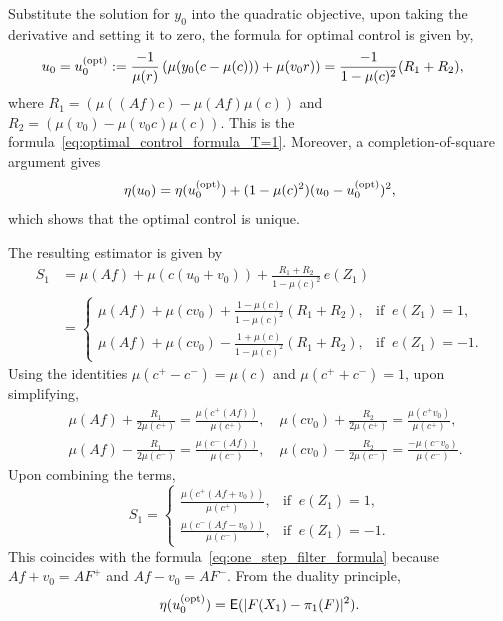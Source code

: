 \documentclass[twoside,11pt]{article}
\def\E{{\sf E}}
\newcommand{\newP}[1]{\medskip\noindent{\bf #1:}}
\def\E{{\sf E}}
\def\E{{\sf E}}
\def\opt{{\text{\rm (opt)}}}
\begin{document}
\newP{$\bullet$ Case where $\mu(r)\neq 0$} Substitute the solution
for $y_0$ into the quadratic objective, upon taking the
derivative and setting it to zero, the formula for optimal control is
given by,
\begin{align*}
  u_0 = u_0^\opt & :=
        \frac{-1}{\mu(r)} \left( \mu(y_0(c-\mu(c))) + \mu
  (v_0 r) \right) =  \frac{-1}{1-\mu(c)^2} (R_1+R_2),
\end{align*}
where $R_1=\left(\mu((Af)c) - \mu(Af)\mu(c) \right)$ and
$R_2=\left(\mu(v_0) - \mu(v_0 c) \mu(c) \right)$.  This is the
formula~\eqref{eq:optimal_control_formula_T=1}.  
Moreover, a completion-of-square argument gives 
\[
\eta(u_0) =  \eta (u_0^\opt) + (1-\mu(c)^2) (u_0-u_0^\opt)^2,
\]
which shows that the optimal control is unique.

The resulting estimator is given by
\begin{align*}
  S_1 &= \mu(Af) + \mu(c(u_0+v_0)) + \frac{R_1+R_2}{1-\mu(c)^2} \, e(Z_1) \\
  &= \begin{cases}
  \mu(Af) + \mu(c v_0) + \frac{1-\mu(c)}{1-\mu(c)^2} (R_1+R_2), &
  \text{if}\;\; e(Z_1)=1, \\[5pt]
     \mu(Af) + \mu(c v_0) - \frac{1+\mu(c)}{1-\mu(c)^2} (R_1+R_2), &
  \text{if}\;\; e(Z_1)=-1.
    \end{cases}
\end{align*}
Using the identities $\mu(c^+- c^-)=\mu(c)$ and $\mu(c^++c^-)=1$, upon
simplifying, 
\begin{align*}
&\mu(Af) + \frac{R_1}{2\mu(c^+)} = \frac{\mu(c^+(Af))}{\mu(c^+)}
  , \quad \mu(c v_0) + \frac{R_2}{2\mu(c^+)}  =  \frac{\mu(c^+
  v_0)}{\mu(c^+)}, \\
& \mu(Af) - \frac{R_1}{2\mu(c^-)} = \frac{\mu(c^-(Af))}{\mu(c^-)}
  , \quad \mu(c v_0) - \frac{R_2}{2\mu(c^-)}  =  \frac{-\mu(c^-
  v_0)}{\mu(c^-)}.
\end{align*}
Upon combining the terms,
\[
S_1 = \begin{cases}
   \frac{\mu(c^+(Af+v_0))}{\mu(c^+)}, &
  \text{if}\;\; e(Z_1)=1, \\[5pt]
    \frac{\mu(c^-(Af-v_0))}{\mu(c^-)}, &
  \text{if}\;\; e(Z_1)=-1 .
    \end{cases}
\]
This coincides with the formula~\eqref{eq:one_step_filter_formula}
because $Af + v_0 = AF^+$ and $Af - v_0 = AF^-$.  From the duality
principle,
\[
\eta (u_0^\opt) =       \E (|F(X_1) - \pi_1(F)|^2).
\]
\end{document}
